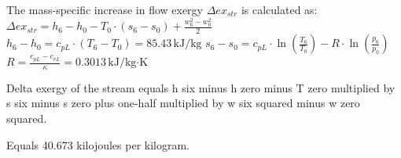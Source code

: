 The mass-specific increase in flow exergy \( \Delta ex_{str} \) is calculated as:  
\( \Delta ex_{str} = h_6 - h_0 - T_0 \cdot (s_6 - s_0) + \frac{w_6^2 - w_0^2}{2} \)  
\( h_6 - h_0 = c_{pL} \cdot (T_6 - T_0) = 85.43 \, \text{kJ/kg} \)  
\( s_6 - s_0 = c_{pL} \cdot \ln \left( \frac{T_6}{T_0} \right) - R \cdot \ln \left( \frac{p_6}{p_0} \right) \)  
\( R = \frac{c_{pL} - c_{vL}}{\kappa} = 0.3013 \, \text{kJ/kg·K} \)

Delta exergy of the stream equals h six minus h zero minus T zero multiplied by s six minus s zero plus one-half multiplied by w six squared minus w zero squared.  

Equals 40.673 kilojoules per kilogram.